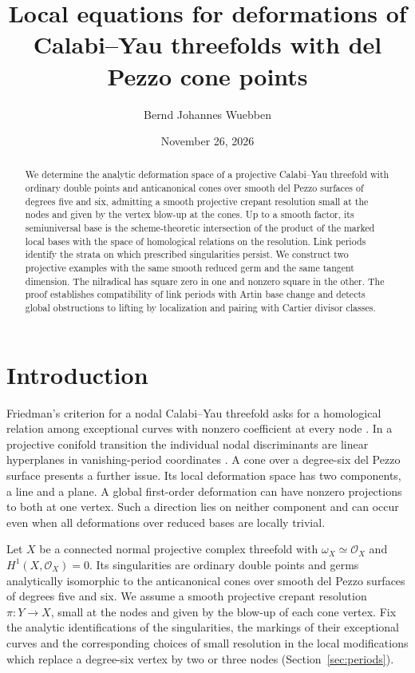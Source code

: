 \documentclass[11pt]{amsart}
\title[Local equations for Calabi--Yau deformations]{Local equations for deformations of Calabi--Yau threefolds with del Pezzo cone points}
\author{Bernd Johannes Wuebben}
\date{November 26, 2026}
\theoremstyle{definition}
\theoremstyle{remark}
\newcommand{\OO}{\mathcal O}
\begin{document}
\begin{abstract}
We determine the analytic deformation space of a projective Calabi--Yau
threefold with ordinary double points and anticanonical cones over smooth
del Pezzo surfaces of degrees five and six, admitting a smooth projective
crepant resolution small at the nodes and given by the vertex blow-up at
the cones. Up to a smooth factor, its semiuniversal base is the
scheme-theoretic intersection of the product of the marked local bases with
the space of homological relations on the resolution. Link periods identify
the strata on which prescribed singularities persist. We construct two
projective examples with the same smooth reduced germ and the same
tangent dimension. The nilradical has square zero in one and nonzero
square in the other. The proof establishes compatibility of link periods with
Artin base change and detects global obstructions to lifting by
localization and pairing with Cartier divisor classes.
\end{abstract}
\maketitle
\section{Introduction}
Friedman's criterion for a nodal Calabi--Yau threefold asks for a
homological relation among exceptional curves with nonzero coefficient
at every node \cite{Fri86}. In a projective conifold transition the
individual nodal discriminants are linear hyperplanes in vanishing-period
coordinates \cite[Lemma~3.13 and Proposition~3.16]{LLW}. A cone over a
degree-six del Pezzo surface presents a further issue. Its local
deformation space has two components, a line and a plane. A global
first-order deformation can have nonzero projections to both at one
vertex. Such a direction lies on neither component and can occur even
when all deformations over reduced bases are locally trivial.

Let $X$ be a connected normal projective complex threefold with
$\omega_X\simeq\OO_X$ and $H^1(X,\OO_X)=0$. Its singularities are
ordinary double points and germs analytically isomorphic to the
anticanonical cones over smooth del Pezzo surfaces of degrees five and
six. We assume a smooth projective crepant resolution $\pi:Y\to X$,
small at the nodes and given by the blow-up of each cone vertex. Fix the
analytic identifications of the singularities, the markings of their
exceptional curves and the corresponding choices of small resolution
in the local modifications which replace a degree-six vertex by two
or three nodes (Section~\ref{sec:periods}).
\end{document}
